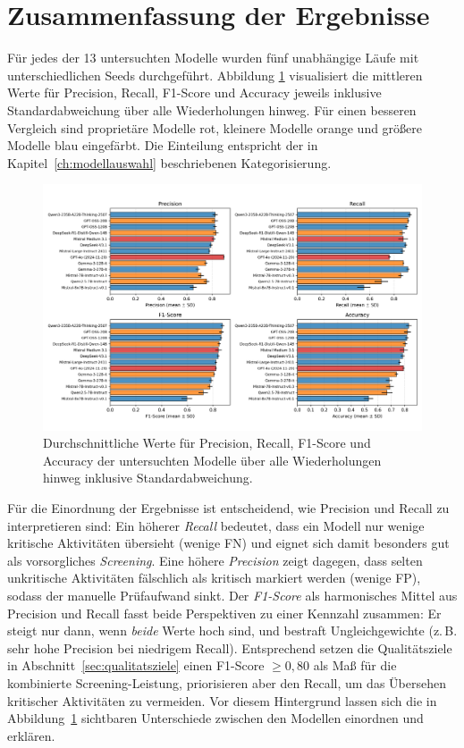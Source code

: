\section{Zusammenfassung der Ergebnisse}\label{sec:ueberblick}

Für jedes der 13 untersuchten Modelle wurden fünf unabhängige Läufe mit unterschiedlichen Seeds durchgeführt. Abbildung \ref{fig:results-evaluation-metrics-comparison} visualisiert die mittleren Werte für Precision, Recall, F1-Score und Accuracy jeweils inklusive Standardabweichung über alle Wiederholungen hinweg. Für einen besseren Vergleich sind proprietäre Modelle rot, kleinere Modelle orange und größere Modelle blau eingefärbt. Die Einteilung entspricht der in Kapitel~\ref{ch:modellauswahl} beschriebenen Kategorisierung.

\begin{figure}[h]
    \centering
    \includegraphics[width=\textwidth]{images/results/evaluation_metrics_comparison_en}
    \caption{Durchschnittliche Werte für Precision, Recall, F1-Score und Accuracy der untersuchten Modelle über alle Wiederholungen hinweg inklusive Standardabweichung.}
    \label{fig:results-evaluation-metrics-comparison}
\end{figure}

Für die Einordnung der Ergebnisse ist entscheidend, wie Precision und Recall zu interpretieren sind: Ein höherer \emph{Recall} bedeutet, dass ein Modell nur wenige kritische Aktivitäten übersieht (wenige \ac{FN}) und eignet sich damit besonders gut als vorsorgliches \emph{Screening}. Eine höhere \emph{Precision} zeigt dagegen, dass selten unkritische Aktivitäten fälschlich als kritisch markiert werden (wenige \ac{FP}), sodass der manuelle Prüfaufwand sinkt. Der \emph{F1-Score} als harmonisches Mittel aus Precision und Recall fasst beide Perspektiven zu einer Kennzahl zusammen: Er steigt nur dann, wenn \emph{beide} Werte hoch sind, und bestraft Ungleichgewichte (z.\,B. sehr hohe Precision bei niedrigem Recall). Entsprechend setzen die Qualitätsziele in Abschnitt~\ref{sec:qualitatsziele} einen F1-Score $\geq 0{,}80$ als Maß für die kombinierte Screening-Leistung, priorisieren aber den Recall, um das Übersehen kritischer Aktivitäten zu vermeiden. Vor diesem Hintergrund lassen sich die in Abbildung~\ref{fig:results-evaluation-metrics-comparison} sichtbaren Unterschiede zwischen den Modellen einordnen und erklären.

